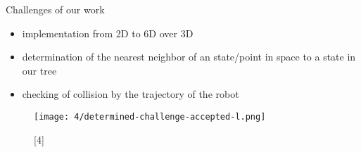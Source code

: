 \documentclass[%
  professionalfonts,%
  xcolor={%
    usenames,%
    dvipsnames,%
    svgnames,%
    table,%
    hyperref%
  }%
]{beamer}
\begin{document}
      \begin{frame}{Challenges of our work}
        \begin{itemize}
          \item implementation from 2D to 6D over 3D
          \item determination of the nearest neighbor of an state/point in space to a state in our tree
          \item checking of collision by the trajectory of the robot
        \end{itemize}
        
        \begin{figure}[h]
          \texttt{[image: 4/determined-challenge-accepted-l.png]}
          \caption{[4]}
          \label{fig:determined-challenge-accepte}
        \end{figure}
        
      \end{frame}
      
\end{document}
